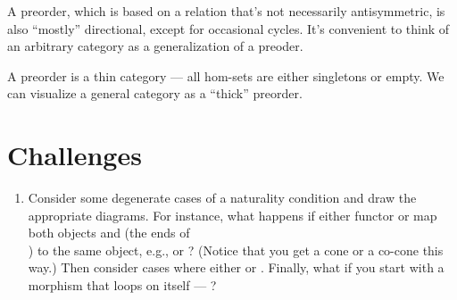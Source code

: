 A preorder, which is based on a relation that's not necessarily
antisymmetric, is also ``mostly'' directional, except for occasional
cycles. It's convenient to think of an arbitrary category as a
generalization of a preoder.

A preorder is a thin category --- all hom-sets are either singletons or
empty. We can visualize a general category as a ``thick'' preorder.

\section{Challenges}\label{challenges}

\begin{enumerate}
\tightlist
\item
  Consider some degenerate cases of a naturality condition and draw the
  appropriate diagrams. For instance, what happens if either functor
   or  map both objects  and 
  (the ends of\\ ) to the same
  object, e.g.,  or ?
  (Notice that you get a cone or a co-cone this way.) Then consider
  cases where either  or .
  Finally, what if you start with a morphism that loops on itself ---
  ?
\end{enumerate}